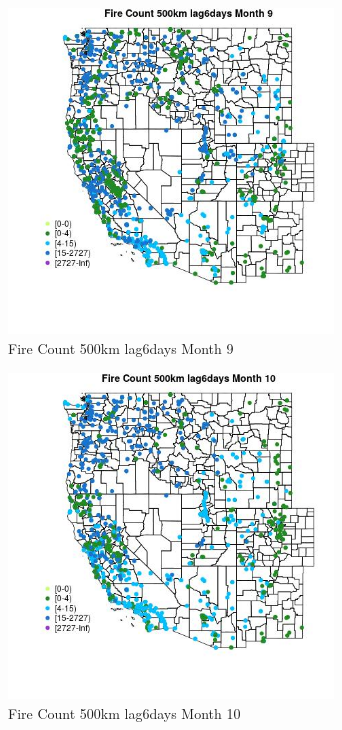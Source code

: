 \begin{figure} 
\centering  
\includegraphics[width=0.77\textwidth]{Code_Outputs/Report_ML_input_PM25_Step4_part_f_de_duplicated_aves_prioritize_24hr_obswNAs_MapObsMo9Fire_Count_500km_lag6days.jpg} 
\caption{\label{fig:Report_ML_input_PM25_Step4_part_f_de_duplicated_aves_prioritize_24hr_obswNAsMapObsMo9Fire_Count_500km_lag6days}Fire Count 500km lag6days Month 9} 
\end{figure} 
 

\begin{figure} 
\centering  
\includegraphics[width=0.77\textwidth]{Code_Outputs/Report_ML_input_PM25_Step4_part_f_de_duplicated_aves_prioritize_24hr_obswNAs_MapObsMo10Fire_Count_500km_lag6days.jpg} 
\caption{\label{fig:Report_ML_input_PM25_Step4_part_f_de_duplicated_aves_prioritize_24hr_obswNAsMapObsMo10Fire_Count_500km_lag6days}Fire Count 500km lag6days Month 10} 
\end{figure} 
 

